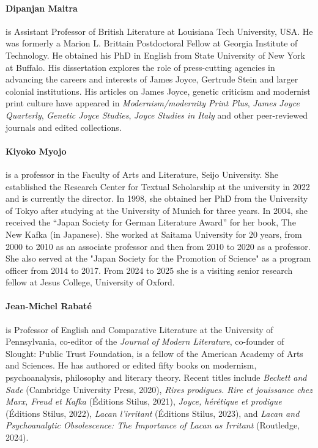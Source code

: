 \paragraph{Dipanjan Maitra} is Assistant Professor of British Literature at
Louisiana Tech University, USA. He was formerly a Marion L. Brittain
Postdoctoral Fellow at Georgia Institute of Technology. He obtained his
PhD in English from State University of New York at Buffalo. His
dissertation explores the role of press-cutting agencies in advancing
the careers and interests of James Joyce, Gertrude Stein and larger
colonial institutions. His articles on James Joyce, genetic criticism
and modernist print culture have appeared in \emph{Modernism/modernity
Print Plus}, \emph{James Joyce Quarterly}, \emph{Genetic Joyce Studies},
\emph{Joyce Studies in Italy} and other peer-reviewed journals and
edited collections.

\paragraph{Kiyoko Myojo} is a professor in the Faculty of Arts and Literature, Seijo University. She established the Research Center for Textual Scholarship at the university in 2022 and is currently the director. In 1998, she obtained her PhD from the University of Tokyo after studying at the University of Munich for three years. In 2004, she received the ``Japan Society for German Literature Award'' for her book, The New Kafka (in Japanese). She worked at Saitama University for 20 years, from 2000 to 2010 as an associate professor and then from 2010 to 2020 as a professor. She also served at the "Japan Society for the Promotion of Science" as a program officer from 2014 to 2017. From 2024 to 2025 she is a visiting senior research fellow at Jesus College, University of Oxford.

\paragraph{Jean-Michel Rabaté} is Professor of English and Comparative Literature at
the University of Pennsylvania, co-editor of the \emph{Journal of Modern
Literature}, co-founder of Slought: Public Trust Foundation, is a fellow
of the American Academy of Arts and Sciences. He has authored or edited
fifty books on modernism, psychoanalysis, philosophy and literary
theory. Recent titles include \emph{Beckett and Sade} (Cambridge
University Press, 2020), \emph{Rires prodigues. Rire et jouissance chez
Marx, Freud et Kafka} (Éditions Stilus, 2021), \emph{Joyce, hérétique et
prodigue} (Éditions Stilus, 2022), \emph{Lacan l'irritant} (Éditions
Stilus, 2023), and \emph{Lacan and Psychoanalytic Obsolescence: The
Importance of Lacan as Irritant} (Routledge, 2024).

